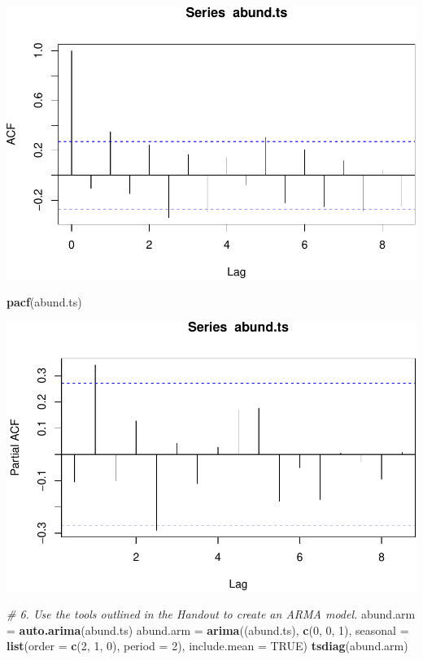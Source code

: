 \documentclass[]{article}
\newenvironment{Shaded}{\begin{snugshade}}{\end{snugshade}}
\newcommand{\KeywordTok}[1]{\textcolor[rgb]{0.13,0.29,0.53}{\textbf{{#1}}}}
\newcommand{\DataTypeTok}[1]{\textcolor[rgb]{0.13,0.29,0.53}{{#1}}}
\newcommand{\DecValTok}[1]{\textcolor[rgb]{0.00,0.00,0.81}{{#1}}}
\newcommand{\StringTok}[1]{\textcolor[rgb]{0.31,0.60,0.02}{{#1}}}
\newcommand{\CommentTok}[1]{\textcolor[rgb]{0.56,0.35,0.01}{\textit{{#1}}}}
\newcommand{\OtherTok}[1]{\textcolor[rgb]{0.56,0.35,0.01}{{#1}}}
\newcommand{\NormalTok}[1]{{#1}}
\begin{document}
\includegraphics{temporal_assignment_files/figure-latex/unnamed-chunk-4-4.pdf}

\begin{Shaded}
\begin{Highlighting}[]
\KeywordTok{pacf}\NormalTok{(abund.ts)}
\end{Highlighting}
\end{Shaded}

\includegraphics{temporal_assignment_files/figure-latex/unnamed-chunk-4-5.pdf}

\begin{Shaded}
\begin{Highlighting}[]
\CommentTok{# 6. Use the tools outlined in the Handout to create an ARMA model.}
\NormalTok{abund.arm =}\StringTok{ }\KeywordTok{auto.arima}\NormalTok{(abund.ts)}
\NormalTok{abund.arm =}\StringTok{ }\KeywordTok{arima}\NormalTok{((abund.ts), }\KeywordTok{c}\NormalTok{(}\DecValTok{0}\NormalTok{, }\DecValTok{0}\NormalTok{, }\DecValTok{1}\NormalTok{), }\DataTypeTok{seasonal =} \KeywordTok{list}\NormalTok{(}\DataTypeTok{order =} \KeywordTok{c}\NormalTok{(}\DecValTok{2}\NormalTok{, }\DecValTok{1}\NormalTok{, }\DecValTok{0}\NormalTok{),}
                  \DataTypeTok{period =} \DecValTok{2}\NormalTok{), }\DataTypeTok{include.mean =} \OtherTok{TRUE}\NormalTok{)}
\KeywordTok{tsdiag}\NormalTok{(abund.arm)}
\end{Highlighting}
\end{Shaded}
\end{document}
